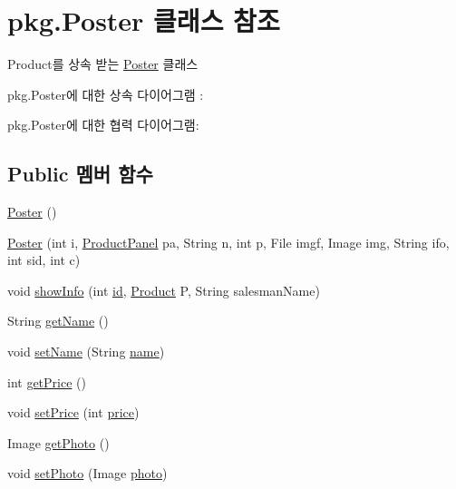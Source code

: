 \hypertarget{classpkg_1_1_poster}{}\section{pkg.\+Poster 클래스 참조}
\label{classpkg_1_1_poster}


Product를 상속 받는 \hyperlink{classpkg_1_1_poster}{Poster} 클래스  




pkg.\+Poster에 대한 상속 다이어그램 \+: 


pkg.\+Poster에 대한 협력 다이어그램\+:
\subsection*{Public 멤버 함수}
\begin{DoxyCompactItemize}
\item 
\hyperlink{classpkg_1_1_poster_a60ded7aeaae27fe520e21c257bae1163}{Poster} ()
\item 
\hyperlink{classpkg_1_1_poster_a3f09f202143dff92ac6ac407eecc54ee}{Poster} (int i, \hyperlink{classpkg_1_1_product_panel}{Product\+Panel} pa, String n, int p, File imgf, Image img, String ifo, int sid, int c)
\item 
void \hyperlink{classpkg_1_1_poster_a30b450a57576d2a77a3fec618deae1ad}{show\+Info} (int \hyperlink{classpkg_1_1_product_ac7846687b2d11faba3be1395fcbbab72}{id}, \hyperlink{classpkg_1_1_product}{Product} P, String salesman\+Name)
\item 
String \hyperlink{classpkg_1_1_product_a33ff6f7a51fc667ad2d2cc670424908c}{get\+Name} ()
\item 
void \hyperlink{classpkg_1_1_product_a9751f56879a4e8b76f958b26aaab4ec1}{set\+Name} (String \hyperlink{classpkg_1_1_product_acdadb9558664acdfd23eff5b2b77ae90}{name})
\item 
int \hyperlink{classpkg_1_1_product_af93b4414ec143311db57e6e4586d129e}{get\+Price} ()
\item 
void \hyperlink{classpkg_1_1_product_ad090e3760620ffe3fa253b169c84eb29}{set\+Price} (int \hyperlink{classpkg_1_1_product_a46c6eb6906d4ee2f6393515f41dba7c9}{price})
\item 
Image \hyperlink{classpkg_1_1_product_acb7237be160d1df9bcfda96a618f23dc}{get\+Photo} ()
\item 
void \hyperlink{classpkg_1_1_product_a2bb5fef6a450832b5d1c8121faeee53c}{set\+Photo} (Image \hyperlink{classpkg_1_1_product_a5d279eb4556860b90305cc26a3ee69be}{photo})
\item 

\end{DoxyCompactItemize}
